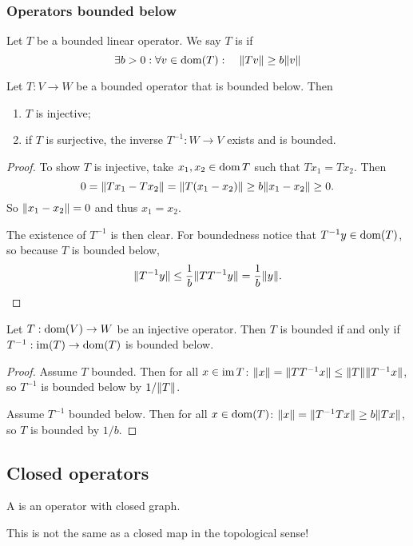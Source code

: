 \subsubsection{Operators bounded below}
\begin{definition}
Let $T$ be a bounded linear operator. We say $T$ is  if
\[ \exists b>0:\forall v\in \operatorname{dom}(T): \quad \lVert Tv\rVert\geq b\lVert v\rVert \]
\end{definition}


\begin{proposition} \label{prop:boundedBelow}
Let $T:V\to W$ be a bounded operator that is bounded below. Then
\begin{enumerate}
\item $T$ is injective;
\item if $T$ is surjective, the inverse $T^{-1}: W\to V$ exists and is bounded.
\end{enumerate}
\end{proposition}
\begin{proof}
To show $T$ is injective, take $x_1,x_2\in \operatorname{dom} T$ such that $Tx_1 = Tx_2$. Then
\[ 0 = \lVert Tx_1 - Tx_2\rVert = \lVert T(x_1 - x_2)\rVert \geq b\lVert x_1 - x_2\rVert \geq 0. \]
So $\lVert x_1 - x_2\rVert = 0$ and thus $x_1=x_2$.

The existence of $T^{-1}$ is then clear. For boundedness notice that $T^{-1}y \in \operatorname{dom}(T)$, so because $T$ is bounded below,
\[ \lVert T^{-1}y\rVert \leq \frac{1}{b}\lVert TT^{-1}y\rVert = \frac{1}{b}\lVert y\rVert. \]
\end{proof}

\begin{lemma} \label{lemma:boundedBelowBounded}
Let $T:\operatorname{dom}(V)\to W$ be an injective operator. Then $T$ is bounded \textup{if and only if} $T^{-1}:\operatorname{im}(T)\to \operatorname{dom}(T)$ is bounded below.
\end{lemma}
\begin{proof}
Assume $T$ bounded. Then for all $x\in\operatorname{im} T$: $\lVert x\rVert = \lVert TT^{-1}x\rVert \leq \lVert T\rVert\lVert T^{-1}x\rVert$, so $T^{-1}$ is bounded below by $1/\lVert T\rVert$.

Assume $T^{-1}$ bounded below. Then for all $x\in\operatorname{dom}(T)$: $\lVert x\rVert = \lVert T^{-1}Tx\rVert \geq b\lVert Tx\rVert$, so $T$ is bounded by $1/b$.
\end{proof}

\subsection{Closed operators}
\begin{definition}
A  is an operator with closed graph.
\end{definition}
This is not the same as a closed map in the topological sense!

